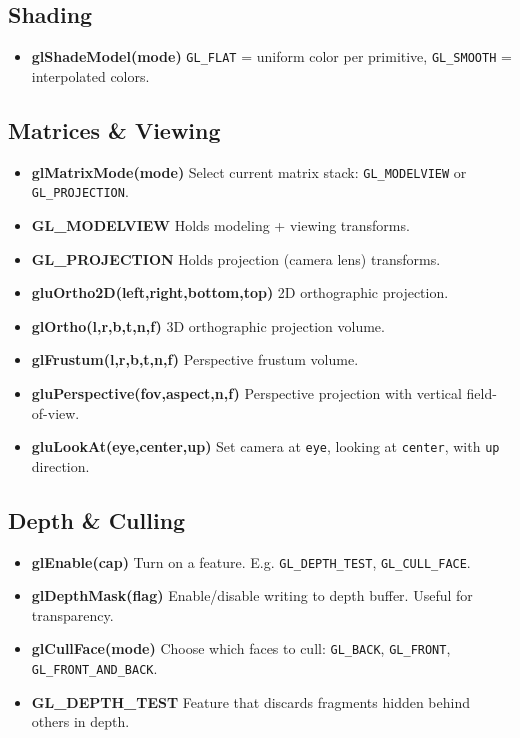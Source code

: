 \documentclass[8pt,twocolumn]{extarticle}
\begin{document}
\subsection*{Shading}
\begin{itemize}
  \item \textbf{glShadeModel(mode)}  
  \texttt{GL\_FLAT} = uniform color per primitive,  
  \texttt{GL\_SMOOTH} = interpolated colors.
\end{itemize}

\subsection*{Matrices \& Viewing}
\begin{itemize}
  \item \textbf{glMatrixMode(mode)}  
  Select current matrix stack: \texttt{GL\_MODELVIEW} or \texttt{GL\_PROJECTION}.

  \item \textbf{GL\_MODELVIEW}  
  Holds modeling + viewing transforms.

  \item \textbf{GL\_PROJECTION}  
  Holds projection (camera lens) transforms.

  \item \textbf{gluOrtho2D(left,right,bottom,top)}  
  2D orthographic projection.

  \item \textbf{glOrtho(l,r,b,t,n,f)}  
  3D orthographic projection volume.

  \item \textbf{glFrustum(l,r,b,t,n,f)}  
  Perspective frustum volume.

  \item \textbf{gluPerspective(fov,aspect,n,f)}  
  Perspective projection with vertical field-of-view.

  \item \textbf{gluLookAt(eye,center,up)}  
  Set camera at \texttt{eye}, looking at \texttt{center}, with \texttt{up} direction.
\end{itemize}

\subsection*{Depth \& Culling}
\begin{itemize}
  \item \textbf{glEnable(cap)}  
  Turn on a feature. E.g. \texttt{GL\_DEPTH\_TEST}, \texttt{GL\_CULL\_FACE}.
  \item \textbf{glDepthMask(flag)}  
  Enable/disable writing to depth buffer. Useful for transparency.
  \item \textbf{glCullFace(mode)}  
  Choose which faces to cull: \texttt{GL\_BACK}, \texttt{GL\_FRONT}, \texttt{GL\_FRONT\_AND\_BACK}.
  \item \textbf{GL\_DEPTH\_TEST}  
  Feature that discards fragments hidden behind others in depth.
\end{itemize}
\end{document}
